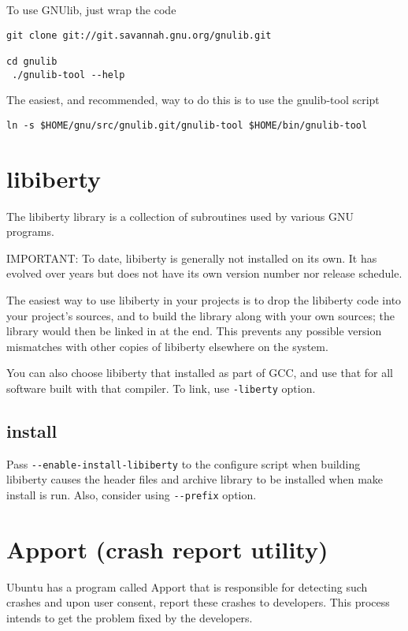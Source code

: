 To use GNUlib, just wrap the code
\begin{verbatim}
git clone git://git.savannah.gnu.org/gnulib.git

cd gnulib
 ./gnulib-tool --help
\end{verbatim}

The easiest, and recommended, way to do this is to use the gnulib-tool script
\begin{verbatim}
ln -s $HOME/gnu/src/gnulib.git/gnulib-tool $HOME/bin/gnulib-tool
\end{verbatim}

\section{libiberty}
\label{sec:libiberty}


The libiberty library is a collection of subroutines used by various GNU
programs.

IMPORTANT: To date, libiberty is generally not installed on its own. It has
evolved over years but does not have its own version number nor release schedule.

The easiest way to use libiberty in your projects is to drop the libiberty code
into your project's sources, and to build the library along with your own
sources; the library would then be linked in at the end. This prevents any
possible version mismatches with other copies of libiberty elsewhere on the
system.

You can also choose libiberty that installed as part of GCC, and use that for
all software built with that compiler. To link, use \verb!-liberty! option.

\subsection{install}

Pass \verb!--enable-install-libiberty! to the configure script when building
libiberty causes the header files and archive library to be installed when make install is run.
Also, consider using \verb!--prefix! option.



\section{Apport (crash report utility)}
\label{sec:apport}

Ubuntu has a program called Apport that is responsible for detecting such
crashes and upon user consent, report these crashes to developers. This process
intends to get the problem fixed by the developers.

